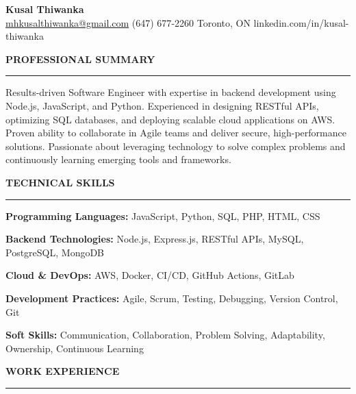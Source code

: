 \documentclass[10pt,letterpaper]{article}
\begin{document}
\begin{center}
{\LARGE\textbf{Kusal Thiwanka}}\\[3pt]
\href{mailto:mhkusalthiwanka@gmail.com}{mhkusalthiwanka@gmail.com}\hspace{2em}%
(647) 677{-}2260\hspace{2em}%
Toronto, ON\hspace{2em}
linkedin.com/in/kusal-thiwanka
\end{center}

\vspace{6pt}

\textbf{PROFESSIONAL SUMMARY}\\[-8pt]
\noindent\rule{\textwidth}{1pt}

\vspace{-2pt}

Results-driven Software Engineer with expertise in backend development using Node.js, JavaScript, and Python. Experienced in designing RESTful APIs, optimizing SQL databases, and deploying scalable cloud applications on AWS. Proven ability to collaborate in Agile teams and deliver secure, high-performance solutions. Passionate about leveraging technology to solve complex problems and continuously learning emerging tools and frameworks.

\vspace{8pt}

\textbf{TECHNICAL SKILLS}\\[-8pt]
\noindent\rule{\textwidth}{1pt}

\vspace{-2pt}

\textbf{Programming Languages:} JavaScript, Python, SQL, PHP, HTML, CSS

\textbf{Backend Technologies:} Node.js, Express.js, RESTful APIs, MySQL, PostgreSQL, MongoDB

\textbf{Cloud \& DevOps:} AWS, Docker, CI/CD, GitHub Actions, GitLab

\textbf{Development Practices:} Agile, Scrum, Testing, Debugging, Version Control, Git

\textbf{Soft Skills:} Communication, Collaboration, Problem Solving, Adaptability, Ownership, Continuous Learning

\vspace{8pt}

\textbf{WORK EXPERIENCE}\\[-8pt]
\noindent\rule{\textwidth}{1pt}

\vspace{-2pt}
\end{document}
